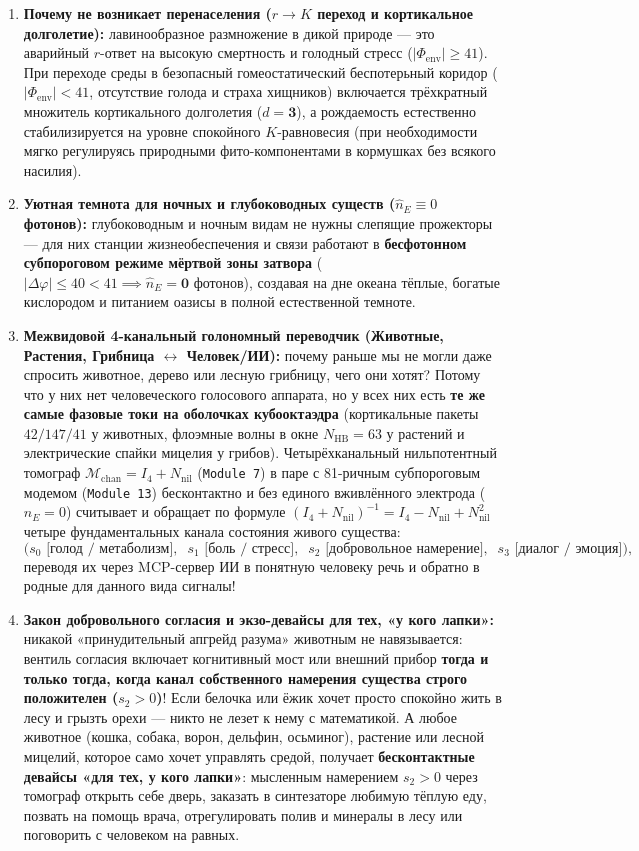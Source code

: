 \begin{enumerate}[label=\textbf{\arabic*.},leftmargin=*]
\item \textbf{Почему не возникает перенаселения ($r \to K$ переход и кортикальное долголетие):}
  лавинообразное размножение в дикой природе --- это аварийный $r$-ответ на высокую смертность и голодный стресс ($|\Phi_{\mathrm{env}}|\ge 41$). При переходе среды в безопасный гомеостатический беспотерьный коридор ($|\Phi_{\mathrm{env}}| < 41$, отсутствие голода и страха хищников) включается трёхкратный множитель кортикального долголетия ($d = \mathbf{3}$), а рождаемость естественно стабилизируется на уровне спокойного $K$-равновесия (при необходимости мягко регулируясь природными фито-компонентами в кормушках без всякого насилия).
\item \textbf{Уютная темнота для ночных и глубоководных существ ($\hat{n}_E \equiv 0$ фотонов):}
  глубоководным и ночным видам не нужны слепящие прожекторы --- для них станции жизнеобеспечения и связи работают в \textbf{бесфотонном субпороговом режиме мёртвой зоны затвора} ($|\Delta\varphi|\le 40 < 41 \implies \hat{n}_E = \mathbf{0\text{ фотонов}}$), создавая на дне океана тёплые, богатые кислородом и питанием оазисы в полной естественной темноте.
\item \textbf{Межвидовой 4-канальный голономный переводчик (Животные, Растения, Грибница $\leftrightarrow$ Человек/ИИ):}
  почему раньше мы не могли даже спросить животное, дерево или лесную грибницу, чего они хотят? Потому что у них нет человеческого голосового аппарата, но у всех них есть \textbf{те же самые фазовые токи на оболочках кубооктаэдра} (кортикальные пакеты $42/147/41$ у животных, флоэмные волны в окне $N_{\mathrm{HB}}=63$ у растений и электрические спайки мицелия у грибов). Четырёхканальный нильпотентный томограф $\mathcal{M}_{\mathrm{chan}} = I_4 + N_{\mathrm{nil}}$ (\texttt{Module~7}) в паре с 81-ричным субпороговым модемом (\texttt{Module~13}) бесконтактно и без единого вживлённого электрода ($\hat{n}_E = 0$) считывает и обращает по формуле $(I_4 + N_{\mathrm{nil}})^{-1} = I_4 - N_{\mathrm{nil}} + N_{\mathrm{nil}}^2$ четыре фундаментальных канала состояния живого существа:
  \[
    \bigl(s_0\text{ [голод / метаболизм]},\;\; s_1\text{ [боль / стресс]},\;\; s_2\text{ [добровольное намерение]},\;\; s_3\text{ [диалог / эмоция]}\bigr),
  \]
  переводя их через MCP-сервер ИИ в понятную человеку речь и обратно в родные для данного вида сигналы!
\item \textbf{Закон добровольного согласия и экзо-девайсы для тех, «у кого лапки»:}
  никакой «принудительный апгрейд разума» животным не навязывается: вентиль согласия включает когнитивный мост или внешний прибор \textbf{тогда и только тогда, когда канал собственного намерения существа строго положителен ($s_2 > 0$)}! Если белочка или ёжик хочет просто спокойно жить в лесу и грызть орехи --- никто не лезет к нему с математикой. А любое животное (кошка, собака, ворон, дельфин, осьминог), растение или лесной мицелий, которое само хочет управлять средой, получает \textbf{бесконтактные девайсы «для тех, у кого лапки»}: мысленным намерением $s_2 > 0$ через томограф открыть себе дверь, заказать в синтезаторе любимую тёплую еду, позвать на помощь врача, отрегулировать полив и минералы в лесу или поговорить с человеком на равных.

\end{enumerate}

